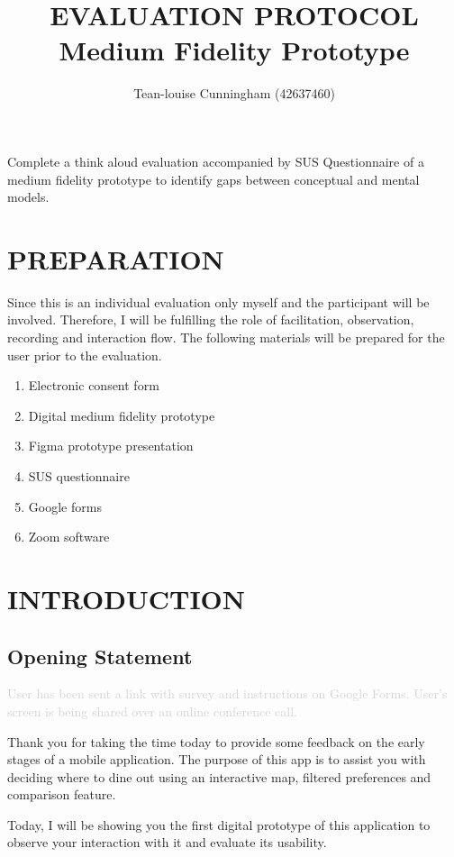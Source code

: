 \documentclass[a4 paper, 10pt]{article}
\title{\textbf{EVALUATION PROTOCOL \\ Medium Fidelity Prototype}}
\author{Tean-louise Cunningham (42637460)}
\date{}
\begin{document}
\maketitle
\begin{center}
Complete a think aloud evaluation accompanied by SUS Questionnaire of a medium fidelity prototype to identify gaps between conceptual and mental models.
\end{center}

\section*{PREPARATION}
Since this is an individual evaluation only myself and the participant will be involved. Therefore, I will be fulfilling the role of facilitation, observation, recording and interaction flow. The following materials will be prepared for the user prior to the evaluation.

\begin{enumerate}
    \item Electronic consent form
    \item Digital medium fidelity prototype
    \item Figma prototype presentation
    \item SUS questionnaire
    \item Google forms
    \item Zoom software
\end{enumerate}

\section*{INTRODUCTION}

    \subsection*{Opening Statement}

        \textcolor{lightgray}{User has been sent a link with survey and instructions on Google Forms. User’s screen is being shared over an online conference call.}

        \begin{itshape}
            Thank you for taking the time today to provide some feedback on the early stages of a mobile application. The purpose of this app is to assist you with deciding where to dine out using an interactive map, filtered preferences and comparison feature.

            Today, I will be showing you the first digital prototype of this application to observe your interaction with it and evaluate its usability.
        \end{itshape}
\end{document}
